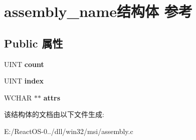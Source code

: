 \hypertarget{structassembly__name}{}\section{assembly\+\_\+name结构体 参考}
\label{structassembly__name}
\subsection*{Public 属性}
\begin{DoxyCompactItemize}
\item 
\mbox{\label{structassembly__name_a93508584516428ee096a8b6929d525bd}} 
U\+I\+NT {\bfseries count}
\item 
\mbox{\label{structassembly__name_a7e9924cccd74d9e28d1e1853aeafa0a8}} 
U\+I\+NT {\bfseries index}
\item 
\mbox{\label{structassembly__name_a52bc08606391a8c6384ac27098514330}} 
W\+C\+H\+AR $\ast$$\ast$ {\bfseries attrs}
\end{DoxyCompactItemize}


该结构体的文档由以下文件生成\+:\begin{DoxyCompactItemize}
\item 
E\+:/\+React\+O\+S-\/0../dll/win32/msi/assembly.\+c\end{DoxyCompactItemize}
